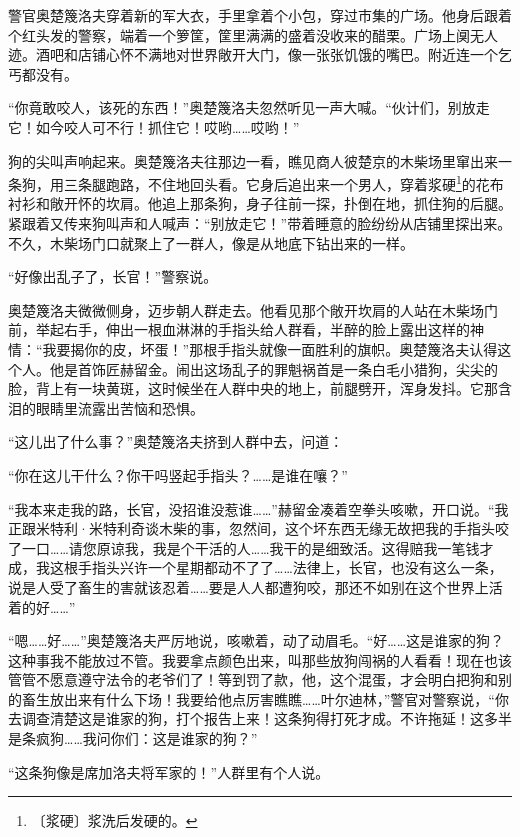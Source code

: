 \documentclass[12pt,UTF-8,openany]{ctexbook}
\begin{document}
\begin{normalsize}
    
    警官奥楚篾洛夫穿着新的军大衣，手里拿着个小包，穿过市集的广场。他身后跟着个红头发的警察，端着一个箩筐，筐里满满的盛着没收来的醋栗。广场上阒无人迹。酒吧和店铺心怀不满地对世界敞开大门，像一张张饥饿的嘴巴。附近连一个乞丐都没有。
    
    “你竟敢咬人，该死的东西！”奥楚篾洛夫忽然听见一声大喊。“伙计们，别放走它！如今咬人可不行！抓住它！哎哟……哎哟！”
    
    狗的尖叫声响起来。奥楚篾洛夫往那边一看，瞧见商人彼楚京的木柴场里窜出来一条狗，用三条腿跑路，不住地回头看。它身后追出来一个男人，穿着浆硬\footnote{〔浆硬〕浆洗后发硬的。}的花布衬衫和敞开怀的坎肩。他追上那条狗，身子往前一探，扑倒在地，抓住狗的后腿。紧跟着又传来狗叫声和人喊声：“别放走它！”带着睡意的脸纷纷从店铺里探出来。不久，木柴场门口就聚上了一群人，像是从地底下钻出来的一样。
    
    “好像出乱子了，长官！”警察说。
    
    奥楚篾洛夫微微侧身，迈步朝人群走去。他看见那个敞开坎肩的人站在木柴场门前，举起右手，伸出一根血淋淋的手指头给人群看，半醉的脸上露出这样的神情：“我要揭你的皮，坏蛋！”那根手指头就像一面胜利的旗帜。奥楚篾洛夫认得这个人。他是首饰匠赫留金。闹出这场乱子的罪魁祸首是一条白毛小猎狗，尖尖的脸，背上有一块黄斑，这时候坐在人群中央的地上，前腿劈开，浑身发抖。它那含泪的眼睛里流露出苦恼和恐惧。
    
    “这儿出了什么事？”奥楚篾洛夫挤到人群中去，问道：
    
    “你在这儿干什么？你干吗竖起手指头？……是谁在嚷？”
    
    “我本来走我的路，长官，没招谁没惹谁……”赫留金凑着空拳头咳嗽，开口说。“我正跟米特利·米特利奇谈木柴的事，忽然间，这个坏东西无缘无故把我的手指头咬了一口……请您原谅我，我是个干活的人……我干的是细致活。这得赔我一笔钱才成，我这根手指头兴许一个星期都动不了了……法律上，长官，也没有这么一条，说是人受了畜生的害就该忍着……要是人人都遭狗咬，那还不如别在这个世界上活着的好……”
    
    “嗯……好……”奥楚篾洛夫严厉地说，咳嗽着，动了动眉毛。“好……这是谁家的狗？这种事我不能放过不管。我要拿点颜色出来，叫那些放狗闯祸的人看看！现在也该管管不愿意遵守法令的老爷们了！等到罚了款，他，这个混蛋，才会明白把狗和别的畜生放出来有什么下场！我要给他点厉害瞧瞧……叶尔迪林，”警官对警察说，“你去调查清楚这是谁家的狗，打个报告上来！这条狗得打死才成。不许拖延！这多半是条疯狗……我问你们：这是谁家的狗？”
    
    “这条狗像是席加洛夫将军家的！”人群里有个人说。
    

\end{normalsize}
\end{document}
